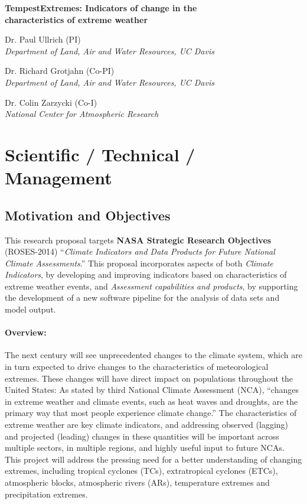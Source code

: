 \documentclass[11pt]{article}
\begin{document}

\begin{center}
{\large \textbf{TempestExtremes: Indicators of change in the \\ characteristics of extreme weather}}

Dr. Paul Ullrich (PI) \\
\textit{Department of Land, Air and Water Resources, UC Davis}

Dr. Richard Grotjahn (Co-PI) \\
\textit{Department of Land, Air and Water Resources, UC Davis}

Dr. Colin Zarzycki (Co-I) \\
\textit{National Center for Atmospheric Research}
\end{center}

\begin{spacing}{-1.0}
\tableofcontents
\end{spacing}

\clearpage

\setcounter{page}{1}

\section{Scientific / Technical / Management}

\subsection{Motivation and Objectives}

This research proposal targets \textbf{NASA Strategic Research Objectives} (ROSES-2014) ``\textit{Climate Indicators and Data Products for Future National Climate Assessments}.''  This proposal incorporates aspects of both \textit{Climate Indicators}, by developing and improving indicators based on characteristics of extreme weather events, and \textit{Assessment capabilities and products}, by supporting the development of a new software pipeline for the analysis of data sets and model output.

\paragraph{Overview:}  The next century will see unprecedented changes to the climate system, which are in turn expected to drive changes to the characteristics of meteorological extremes. These changes will have direct impact on populations throughout the United States: As stated by third National Climate Assessment (NCA), ``changes in extreme weather and climate events, such as heat waves and droughts, are the primary way that most people experience climate change.'' The characteristics of extreme weather are key climate indicators, and addressing observed (lagging) and projected (leading) changes in these quantities will be important across multiple sectors, in multiple regions, and highly useful input to future NCAs.  This project will address the pressing need for a better understanding of changing extremes, including tropical cyclones (TCs), extratropical cyclones (ETCs), atmospheric blocks, atmospheric rivers (ARs), temperature extremes and precipitation extremes. 
\end{document}
